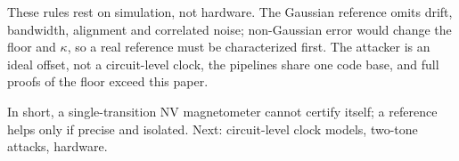 \documentclass[conference,9pt]{IEEEtran}
\begin{document}
\label{sec:conclusion}

These rules rest on simulation, not hardware. The Gaussian reference omits drift, bandwidth, alignment and correlated noise; non-Gaussian error
would change the floor and $\kappa$, so a real reference must be characterized first.
The attacker is an ideal offset, not a circuit-level clock, the pipelines share one code base,
and full proofs of the floor exceed this paper.



In short, a single-transition NV magnetometer cannot certify itself; a reference helps only if
precise and isolated. Next: circuit-level clock models, two-tone attacks, hardware.



\end{document}
